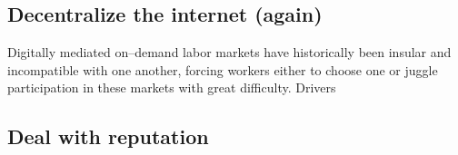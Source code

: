 \documentclass{sigchi}
\begin{document}
\subsection{Decentralize the internet (again)}
Digitally mediated on--demand labor markets have historically been insular and incompatible with one another,
forcing workers either to choose one or juggle participation in these markets with great difficulty.
Drivers 

\subsection{Deal with reputation}

















\end{document}
